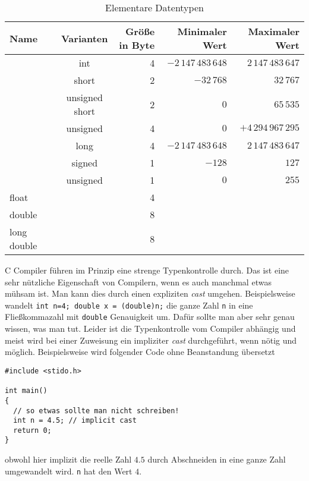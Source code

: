 \begin{table}[t]
\caption{Elementare Datentypen\label{tabelle1}}  %
\centering
\begin{tabular}{|l c c rrr|}
\hline
Name & & Varianten & Größe in Byte & Minimaler Wert & Maximaler Wert
\\[0.5ex]   
\hline %
		       & & int &4 & $-2\,147\,483\,648$ & $2\,147\,483\,647$ \\[-0.0ex]
		       & & short & 2 & $-32\,768$ & $32\,767$ \\[-0.0ex]
\raisebox{1ex}{int}  & & unsigned short& 2 & $0$ & $65\,535$ \\[-0.0ex]
		       & &unsigned& 4 & $0$ & $ +4\,294\,967\,295$ \\[1ex]
		       & &long& 4 &  $-2\,147\,483\,648$ & $2\,147\,483\,647$ \\
\hline
                            & &signed & 1 & $-128$ & $127$ \\[-1ex]
\raisebox{1.5ex}{char} &    & unsigned &1 & $0$ & $255$  \\[1ex]
\hline
float & & & 4 &  &  \\
double& & & 8 &  &  \\
long double& & &8 &  &  \\[1ex]

\hline                          %
\end{tabular}
\label{tab:PPer}
\end{table}

C Compiler führen im Prinzip eine strenge Typenkontrolle durch.
Das ist eine sehr nützliche Eigenschaft von Compilern, wenn es auch manchmal etwas mühsam ist. 
Man kann dies durch einen expliziten \emph{cast} umgehen.
Beispielsweise wandelt \texttt{int n=4; double x = (double)n;} die ganze Zahl \texttt{n} in eine Fließkommazahl mit \texttt{double} Genauigkeit um.
Dafür sollte man aber sehr genau wissen, was man tut.
Leider ist die Typenkontrolle vom Compiler abhängig und meist wird bei einer Zuweisung ein impliziter \emph{cast} durchgeführt, wenn nötig und möglich.
Beispielsweise wird folgender Code ohne Beanstandung übersetzt
\begin{lstlisting}[caption={Ungenaue Variablenzuweisung, implizit cast}, belowcaptionskip=0.3em]
#include <stido.h>

int main()
{
  // so etwas sollte man nicht schreiben!
  int n = 4.5; // implicit cast
  return 0;
}
\end{lstlisting}
obwohl hier implizit die reelle Zahl $4.5$ durch Abschneiden in eine ganze Zahl umgewandelt wird.
\texttt{n} hat den Wert $4$.


